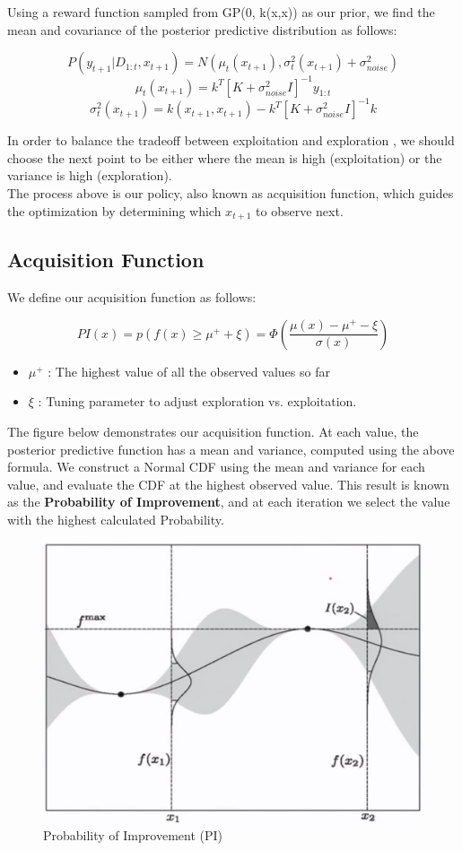 \documentclass{article}
\begin{document}
Using a reward function sampled from GP(0, k(x,x)) as our prior, we find the mean and covariance of the posterior predictive distribution as follows:

$$P(y_{t+1} | D_{1:t}, x_{t+1}) = N(\mu_t(x_{t+1}), \sigma_t^2(x_{t+1}) + \sigma_{noise}^2)$$
$$\mu_t(x_{t+1}) = k^T[K + \sigma_{noise}^2I]^{-1}y_{1:t}$$
$$\sigma_t^2(x_{t+1}) = k(x_{t+1}, x_{t+1}) - k^T[K + \sigma_{noise}^2I]^{-1}k$$

In order to balance the tradeoff between exploitation and exploration , we should choose the next point to be either where the mean is high (exploitation) or the variance is high (exploration).\\

The process above is our policy, also known as acquisition function, which guides the optimization by determining which $x_{t+1}$ to observe next.

\subsection{Acquisition Function}

We define our acquisition function as follows:

$$PI(x) = p(f(x) \geq \mu^+ + \xi) = \Phi(\frac{\mu(x) - \mu^+ - \xi}{\sigma(x)})$$
\begin{itemize}
\item $\mu^+$ : The highest value of all the observed values so far
\item $\xi$ : Tuning parameter to adjust exploration vs. exploitation.
\end{itemize}

The figure below demonstrates our acquisition function. At each value, the posterior predictive function has a mean and variance, computed using the above formula. We construct a Normal CDF using the mean and variance for each value, and evaluate the CDF at the highest observed value. This result is known as the \textbf{Probability of Improvement}, and at each iteration we select the value with the highest calculated Probability.

\begin{figure}[H]
\centering
\includegraphics[scale=0.4]{Prob_Improvement.png}
\caption{Probability of Improvement (PI)}
\end{figure}
\end{document}

